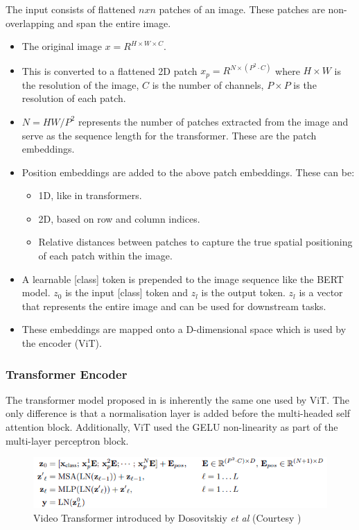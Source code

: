 \par The input consists of flattened $nxn$ patches of an image. These patches are non-overlapping and span the entire image. 
\begin{itemize}
	\item The original image $x = R^{H \times W \times C}$.
	\item This is converted to a flattened 2D patch $x_p = R^{N \times (P^2 \cdot C)}$ where $H \times W$ is the resolution of the image, $C$ is the number of channels, $P \times P$ is the resolution of each patch.
	\item $N = HW / P^2$ represents the number of patches extracted from the image and serve as the sequence length for the transformer. These are the patch embeddings.
	\item Position embeddings are added to the above patch embeddings. These can be:
	\begin{itemize}
		\item 1D, like in transformers.
		\item 2D, based on row and column indices.
		\item Relative distances between patches to capture the true spatial positioning of each patch within the image.
	\end{itemize}
	\item A learnable [class] token is prepended to the image sequence like the BERT model. $z_0$ is the input [class] token and $z_l$ is the output token. $z_l$ is a vector that represents the entire image and can be used for downstream tasks.
	\item These embeddings are mapped onto a D-dimensional space which is used by the encoder (ViT).
\end{itemize}
\par

\subsubsection{Transformer Encoder}

\par The transformer model proposed in \cite{tfm} is inherently the same one used by ViT. The only difference is that a normalisation layer is added before the multi-headed self attention block. Additionally, ViT used the GELU non-linearity as part of the multi-layer perceptron block. \par

\begin{figure}
	\centering
	\includegraphics[width=\linewidth]{assets/img/vit-eq.png}
	\caption{Video Transformer introduced by Dosovitskiy \textit{et al} (Courtesy \cite{vit})}
\end{figure}


